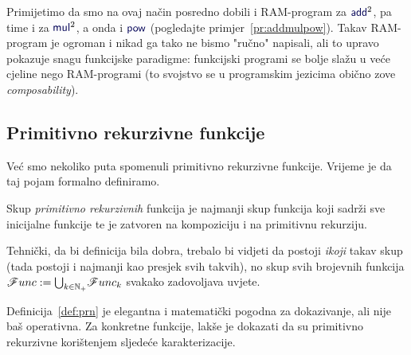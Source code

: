 Primijetimo da smo na ovaj način posredno dobili i RAM-program za $\f{add}^2$, pa time i za $\f{mul}^2$, a onda i $\f{pow}$ (pogledajte primjer~\ref{pr:addmulpow}). Takav RAM-program je ogroman i nikad ga tako ne bismo "ručno" napisali, ali to upravo pokazuje snagu funkcijske paradigme: funkcijski programi se bolje slažu u veće cjeline nego RAM-programi (to svojstvo se u programskim jezicima obično zove \emph{composability}). 
\subsection{Primitivno rekurzivne funkcije}

Već smo nekoliko puta spomenuli primitivno rekurzivne funkcije. Vrijeme je da taj pojam formalno definiramo.

\begin{definicija}[{name=[primitivno rekurzivne funkcije]}]\label{def:prn}
Skup \emph{primitivno rekurzivnih} funkcija je najmanji skup funkcija koji sadrži sve inicijalne funkcije te je zatvoren na kompoziciju i na primitivnu rekurziju.
\end{definicija}

Tehnički, da bi definicija bila dobra, trebalo bi vidjeti da postoji \emph{ikoji} takav skup (tada postoji i najmanji kao presjek svih takvih), no skup svih brojevnih funkcija $\mathscr Func:=\bigcup_{k\in{\mathbb N}_+}\!\mathscr Func_k$ svakako zadovoljava uvjete.

Definicija~\ref{def:prn} je elegantna i matematički pogodna za dokazivanje, ali nije baš operativna. Za konkretne funkcije, lakše je dokazati da su primitivno rekurzivne korištenjem sljedeće karakterizacije.

